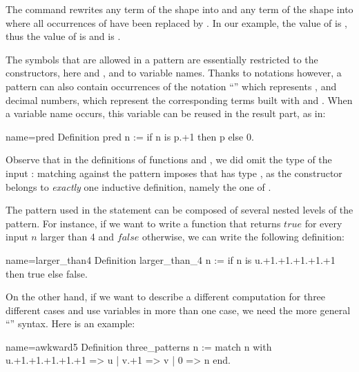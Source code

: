 The  command rewrites any term of the shape
 into  and any term of the shape
 into  where all occurrences of
 have been replaced by .  In our example, the value of
 is , thus the value of  is  and  is .


The symbols that are allowed in a pattern are essentially restricted
to the constructors, here  and , and to variable names.
Thanks to notations however, a pattern can also contain
occurrences of the notation ``'' which represents , and
decimal numbers, which represent the corresponding terms built with
 and .  When a variable name occurs, this variable can be
reused in the result part, as in:

\begin{coq}{name=pred}{}
Definition pred n := if n is p.+1 then p else 0.
\end{coq}

Observe that in the definitions of functions  and
, we did omit the type of the input : matching
 against  the  pattern imposes that  has type
, as the  constructor belongs to \emph{exactly}
one inductive definition, namely the one of .

The pattern used in the  statement can be composed of
several nested levels of the  pattern.  For instance,
if we want to write a function
that returns \(true\) for every input \(n\) larger than 4
and \(false\) otherwise, we can write the following definition:

\begin{coq}{name=larger_than4}{}
Definition larger_than_4 n :=
  if n is u.+1.+1.+1.+1.+1 then true else false.
\end{coq}

On the other hand, if we want to describe a different computation for
three different cases and use variables in more than one case, we need
the more general ``'' syntax.  Here is an
example:

\begin{coq}{name=awkward5}{}
Definition three_patterns n :=
  match n with
    u.+1.+1.+1.+1.+1 => u
  | v.+1 => v
  | 0 => n
  end.
\end{coq}

